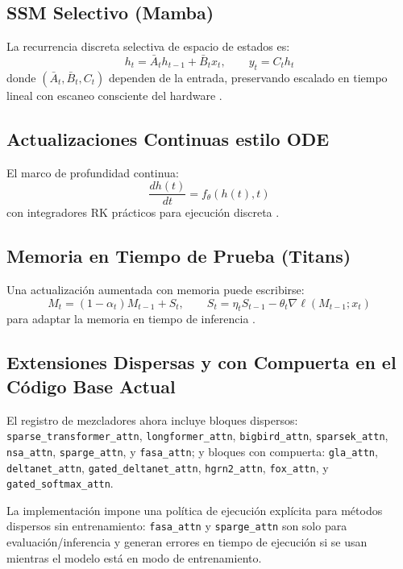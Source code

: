 \documentclass[11pt,a4paper]{article}
\begin{document}
\subsection{SSM Selectivo (Mamba)}
La recurrencia discreta selectiva de espacio de estados es:
\[
h_t=\bar{A}_t h_{t-1}+\bar{B}_t x_t,\qquad y_t=C_t h_t
\]
donde $(\bar{A}_t,\bar{B}_t,C_t)$ dependen de la entrada, preservando escalado en tiempo lineal con escaneo consciente del hardware \citep{gu_mamba_2023,hwang_hydra_2024}.

\subsection{Actualizaciones Continuas estilo ODE}
El marco de profundidad continua:
\[
\frac{dh(t)}{dt}=f_\theta(h(t),t)
\]
con integradores RK prácticos para ejecución discreta \citep{zhang_continuous_2021}.

\subsection{Memoria en Tiempo de Prueba (Titans)}
Una actualización aumentada con memoria puede escribirse:
\[
M_t=(1-\alpha_t)M_{t-1}+S_t,\qquad
S_t=\eta_t S_{t-1}-\theta_t\nabla \ell(M_{t-1};x_t)
\]
para adaptar la memoria en tiempo de inferencia \citep{behrouz_titans_2025,behrouz_titans_2024}.

\subsection{Extensiones Dispersas y con Compuerta en el Código Base Actual}
El registro de mezcladores ahora incluye bloques dispersos:
\texttt{sparse\_transformer\_attn}, \texttt{longformer\_attn}, \texttt{bigbird\_attn},
\texttt{sparsek\_attn}, \texttt{nsa\_attn}, \texttt{sparge\_attn}, y \texttt{fasa\_attn};
y bloques con compuerta:
\texttt{gla\_attn}, \texttt{deltanet\_attn}, \texttt{gated\_deltanet\_attn},
\texttt{hgrn2\_attn}, \texttt{fox\_attn}, y \texttt{gated\_softmax\_attn}.

La implementación impone una política de ejecución explícita para métodos dispersos sin entrenamiento:
\texttt{fasa\_attn} y \texttt{sparge\_attn} son solo para evaluación/inferencia y generan errores en tiempo de ejecución si se usan mientras el modelo está en modo de entrenamiento.
\end{document}
